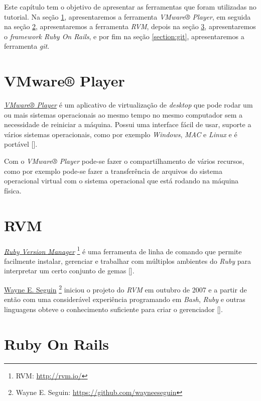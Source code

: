 Este capítulo tem o objetivo de apresentar as ferramentas que foram utilizadas no tutorial. Na seção
\ref{section:vmware_player}, apresentaremos a ferramenta \emph{VMware® Player}, em seguida na seção
\ref{section:rvm}, apresentaremos a ferramenta \emph{RVM}, depois na seção \ref{section:ruby_on_rails},
apresentaremos o \emph{framework Ruby On Rails}, e por fim na seção \ref{section:git}, apresentaremos
a ferramenta \emph{git}.

\section{VMware® Player}
\label{section:vmware_player}

\emph{\href{http://www.vmware.com/products/player}{VMware® Player}} é um aplicativo de virtualização de
\emph{desktop} que pode rodar um ou mais sistemas operacionais ao mesmo tempo no mesmo computador sem
a necessidade de reiniciar a máquina. Possui uma interface fácil de usar, suporte a vários sistemas
operacionais, como por exemplo \emph{Windows}, \emph{MAC} e \emph{Linux} e é portável
[].

Com o \emph{VMware® Player} pode-se fazer o compartilhamento de vários recursos, como por exemplo pode-se
fazer a transferência de arquivos do sistema operacional virtual com o sistema operacional que está rodando
na máquina física.

\section{RVM}
\label{section:rvm}

\emph{\href{http://rvm.io/}{Ruby Version Manager}} \footnote{RVM: \url{http://rvm.io/}} é uma
ferramenta de linha de comando que permite facilmente instalar, gerenciar e trabalhar com múltiplos ambientes
do \emph{Ruby} para interpretar um certo conjunto de gemas [].

 \href{https://github.com/wayneeseguin}{Wayne E. Seguin} \footnote{Wayne E. Seguin:
 \url{https://github.com/wayneeseguin}} iniciou o projeto do \emph{RVM} em outubro de 2007
e a partir de então com uma considerável experiência programando em \emph{Bash}, \emph{Ruby} e outras
linguagens obteve o conhecimento suficiente para criar o gerenciador [].

\section{Ruby On Rails}
\label{section:ruby_on_rails}

